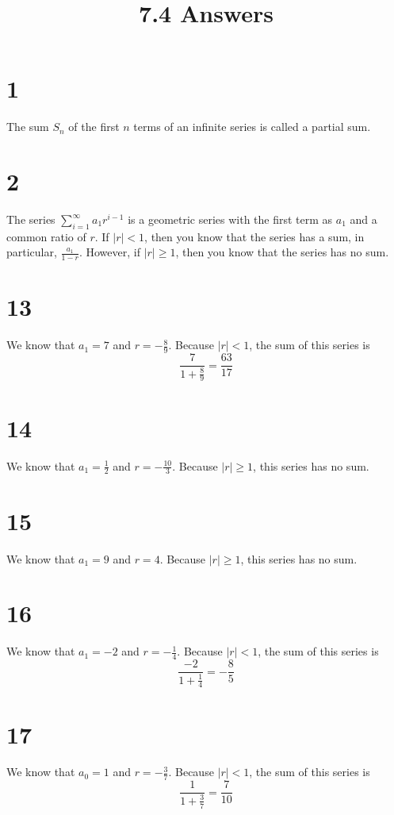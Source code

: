 \documentclass{article}
\title{7.4 Answers}
\theoremstyle{definition}
\newcommand{\?}{\stackrel{?}{=}}
\begin{document}
\maketitle

\section*{1}
The sum $S_n$ of the first $n$ terms of an infinite series is called a partial sum.

\section*{2}
The series $\sum_{i=1}^{\infty}a_1r^{i-1}$ is a geometric series with the first term as $a_1$ and a common ratio of $r$. If $|r|<1$, then you know that the series has a sum, in particular, 
$\frac{a_1}{1-r}$. However, if $|r|\ge 1$, then you know that the series has no sum.

\section*{13}
We know that $a_1=7$ and $r=-\frac{8}{9}$. Because $|r|<1$, the sum of this series is
\[ \frac{7}{1+\frac{8}{9}}=\frac{63}{17} \]

\section*{14}
We know that $a_1=\frac{1}{2}$ and $r=-\frac{10}{3}$. Because $|r|\ge 1$, this series has no sum.

\section*{15}
We know that $a_1=9$ and $r=4$. Because $|r|\ge 1$, this series has no sum.

\section*{16}
We know that $a_1=-2$ and $r=-\frac{1}{4}$. Because $|r|<1$, the sum of this series is
\[ \frac{-2}{1+\frac{1}{4}}=-\frac{8}{5} \]

\section*{17}
We know that $a_0=1$ and $r=-\frac{3}{7}$. Because $|r|<1$, the sum of this series is
\[ \frac{1}{1+\frac{3}{7}}=\frac{7}{10} \]
\end{document}
